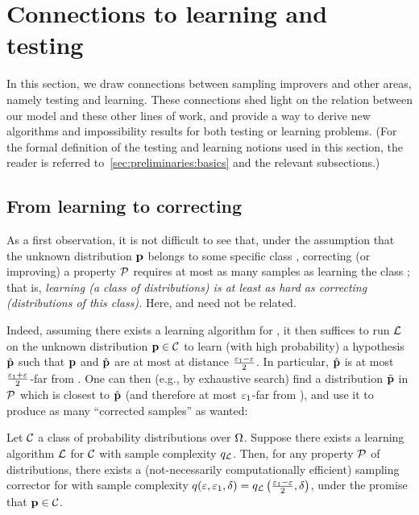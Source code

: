\section{Connections to learning and testing}\label{sec:connections}
	In this section, we draw connections between sampling improvers and other areas, namely testing and learning. These connections shed light on the relation between our model and these other lines of work, and provide a way to derive new algorithms and impossibility results for both testing or learning problems. (For the formal definition of the testing and learning notions used in this section, the reader is referred to~\cref{sec:preliminaries:basics} and the relevant subsections.)

\subsection{From learning to correcting}\label{ssec:connection:learning:approach}As a first observation, it is not difficult to see that, under the assumption that the unknown distribution $\mathbf{p}$ belongs to some specific class \class, correcting (or improving) a property $\mathcal{P}$ requires at most as many samples as learning the class \class; that is, \emph{learning (a class of distributions) is at least as hard as correcting (distributions of this class).} Here, \property and \class need not be related.

Indeed, assuming there exists a learning algorithm \Learner for \class, it then suffices to run $\mathcal{L}$ on the unknown distribution $\mathbf{p}\in\mathcal{C}$ to learn (with high probability) a hypothesis $\hat{\mathbf{p}}$ such that $\mathbf{p}$ and $\hat{\mathbf{p}}$ are at most at distance $\frac{\varepsilon_1-\varepsilon}{2}$. In particular, $\hat{\mathbf{p}}$ is at most $\frac{\varepsilon_1+\varepsilon}{2}$-far from \property. One can then (e.g., by exhaustive search) find a distribution $\tilde{\mathbf{p}}$ in $\mathcal{P}$ which is closest to $\hat{\mathbf{p}}$ (and therefore at most $\varepsilon_1$-far from \D), and use it to produce as many ``corrected samples'' as wanted:

\begin{theorem}\label{theo:connection:regular:learning}
Let $\mathcal{C}$ a class of probability distributions over ${\Omega}$. Suppose there exists a learning algorithm $\mathcal{L}$ for $\mathcal{C}$ with sample complexity $q_\mathcal{L}$.
Then, for any property $\mathcal{P}$ of distributions, there exists a (not-necessarily computationally efficient) sampling corrector for \property with sample complexity $q(\varepsilon,\varepsilon_1,\delta)=q_\mathcal{L}\left(\frac{\varepsilon_1-\varepsilon}{2},\delta\right)$, under the promise that $\mathbf{p}\in\mathcal{C}$.
\end{theorem}

